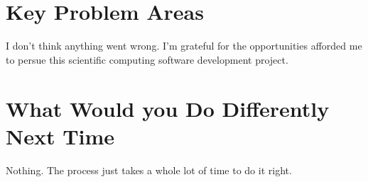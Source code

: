 \documentclass[12pt, titlepage]{article}
\begin{document}
\section{Key Problem Areas}

I don't think anything went wrong. I'm grateful for the opportunities afforded me to
persue this scientific computing software development project.

\section{What Would you Do Differently Next Time}

Nothing. The process just takes a whole lot of time to do it right.




\end{document}
